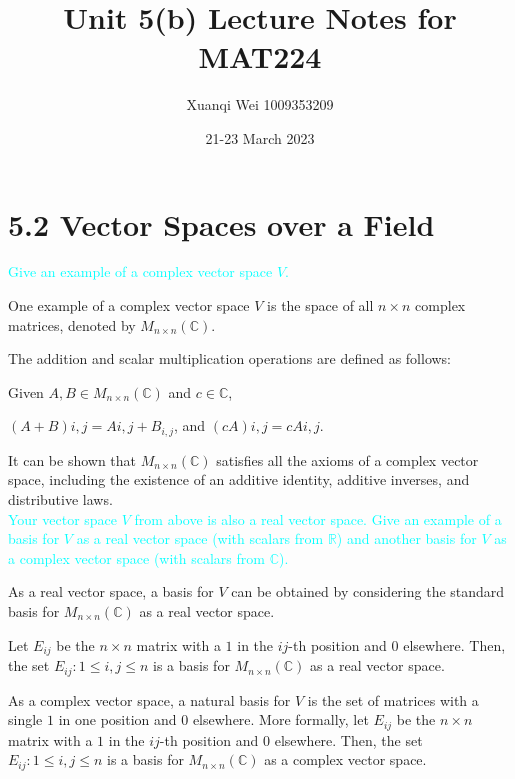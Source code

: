 \documentclass[fontsize=12pt]{scrartcl}
\title{Unit 5(b) Lecture Notes for MAT224}
\author{Xuanqi Wei 1009353209}
\date{21-23 March 2023}
\begin{document}
\maketitle

\newpage

\section{5.2 Vector Spaces over a Field}

\bigskip

\noindent
\textcolor{cyan}{Give an example of a complex vector space $V$.}

\noindent
One example of a complex vector space $V$ is the space of all $n\times n$ complex matrices, denoted by $M_{n\times n}(\mathbb{C})$.

\noindent
The addition and scalar multiplication operations are defined as follows:

\noindent
Given $A,B \in M_{n\times n}(\mathbb{C})$ and $c \in \mathbb{C}$,

\noindent
$(A+B){i,j} = A{i,j} + B_{i,j}$, and $(cA){i,j} = cA{i,j}$.

\noindent
It can be shown that $M_{n\times n}(\mathbb{C})$ satisfies all the axioms of a complex vector space, including the existence of an additive identity, additive inverses, and distributive laws.
\\

\noindent
\textcolor{cyan}{Your vector space $V$ from above is also a real vector space. Give an example of a basis for $V$ as a real vector space (with scalars from $\mathbb{R}$) and another basis for $V$ as a complex vector space (with scalars from $\mathbb{C}$).}

\noindent
As a real vector space, a basis for $V$ can be obtained by considering the standard basis for $M_{n\times n}(\mathbb{C})$ as a real vector space.

\noindent
Let $E_{ij}$ be the $n\times n$ matrix with a $1$ in the $ij$-th position and $0$ elsewhere. Then, the set ${E_{ij} : 1\leq i,j\leq n}$ is a basis for $M_{n\times n}(\mathbb{C})$ as a real vector space.

\noindent
As a complex vector space, a natural basis for $V$ is the set of matrices with a single $1$ in one position and $0$ elsewhere. More formally, let $E_{ij}$ be the $n\times n$ matrix with a $1$ in the $ij$-th position and $0$ elsewhere. Then, the set ${E_{ij} : 1\leq i,j\leq n}$ is a basis for $M_{n\times n}(\mathbb{C})$ as a complex vector space.
\\
\end{document}
